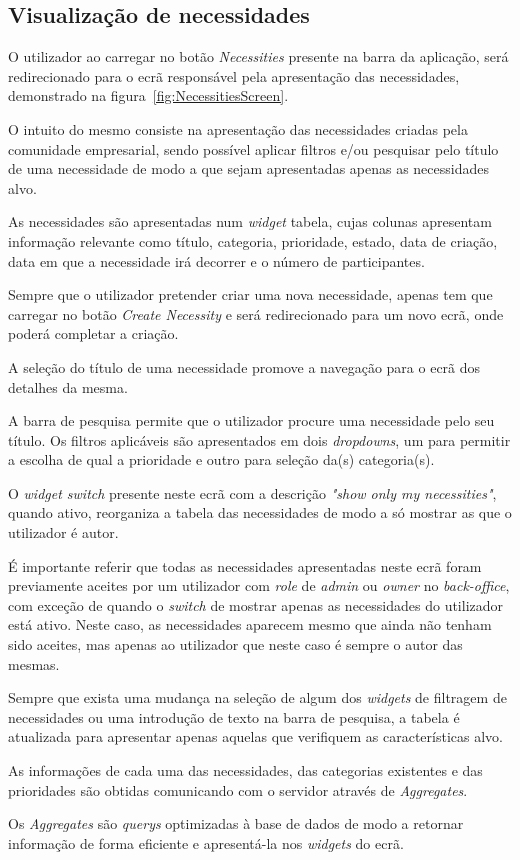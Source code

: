 \subsection{Visualização de necessidades}\label{subsec:implementacao:necessities}
O utilizador ao carregar no botão \textit{Necessities} presente na barra da aplicação, será redirecionado para o ecrã responsável pela apresentação das necessidades, demonstrado na figura~\ref{fig:NecessitiesScreen}. 
\par
O intuito do mesmo consiste na apresentação das necessidades criadas pela comunidade empresarial, sendo possível aplicar filtros e/ou pesquisar pelo título de uma necessidade de modo a que sejam apresentadas apenas as necessidades alvo.
\par
As necessidades são apresentadas num \textit{widget} tabela, cujas colunas apresentam informação relevante como título, categoria, prioridade, estado, data de criação, data em que a necessidade irá decorrer e o número de participantes. 
\par
Sempre que o utilizador pretender criar uma nova necessidade, apenas tem que carregar no botão \textit{Create Necessity} e será redirecionado para um novo ecrã, onde poderá completar a criação.
\par
A seleção do título de uma necessidade promove a navegação para o ecrã dos detalhes da mesma.
\par
A barra de pesquisa permite que o utilizador procure uma necessidade pelo seu título.
Os filtros aplicáveis são apresentados em dois \textit{dropdowns}, um para permitir a escolha de qual a prioridade e outro para seleção da(s) categoria(s).
\par
O \textit{ widget switch} presente neste ecrã com a descrição \textit{"show only my necessities"}, quando ativo, reorganiza a tabela das necessidades de modo a só mostrar as que o utilizador é autor.
\par
É importante referir que todas as necessidades apresentadas neste ecrã foram previamente aceites por um utilizador com \textit{role} de \textit{admin} ou \textit{owner} no \textit{back-office}, com exceção de quando o \textit{switch} de mostrar apenas as necessidades do utilizador está ativo. 
Neste caso, as necessidades aparecem mesmo que ainda não tenham sido aceites, mas apenas ao utilizador que neste caso é sempre o autor das mesmas. 
\par
Sempre que exista uma mudança na seleção de algum dos \textit{widgets} de filtragem de necessidades ou uma introdução de texto na barra de pesquisa, a tabela é atualizada para apresentar apenas aquelas que verifiquem as características alvo. 
\par
As informações de cada uma das necessidades, das categorias existentes e das prioridades são obtidas comunicando com o servidor através de \textit{Aggregates}. 
\par
Os \textit{Aggregates} são \textit{querys} optimizadas à base de dados de modo a retornar informação de forma eficiente e apresentá-la nos \textit{widgets} do ecrã.

